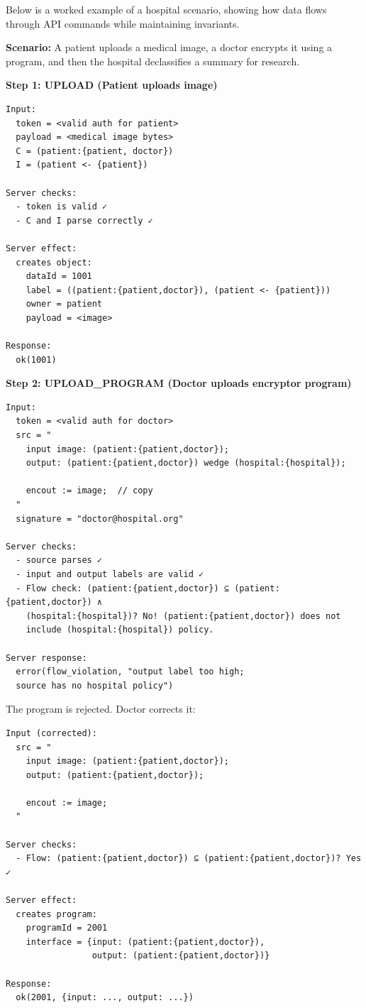 Below is a worked example of a hospital scenario, showing how data flows through API commands while maintaining invariants.

\textbf{Scenario:} A patient uploads a medical image, a doctor encrypts it using a program, and then the hospital declassifies a summary for research.

\textbf{Step 1: UPLOAD (Patient uploads image)}

\begin{verbatim}
Input:
  token = <valid auth for patient>
  payload = <medical image bytes>
  C = (patient:{patient, doctor})
  I = (patient <- {patient})

Server checks:
  - token is valid ✓
  - C and I parse correctly ✓
  
Server effect:
  creates object:
    dataId = 1001
    label = ((patient:{patient,doctor}), (patient <- {patient}))
    owner = patient
    payload = <image>
    
Response:
  ok(1001)
\end{verbatim}

\textbf{Step 2: UPLOAD\_PROGRAM (Doctor uploads encryptor program)}

\begin{verbatim}
Input:
  token = <valid auth for doctor>
  src = "
    input image: (patient:{patient,doctor});
    output: (patient:{patient,doctor}) wedge (hospital:{hospital});
    
    encout := image;  // copy
  "
  signature = "doctor@hospital.org"

Server checks:
  - source parses ✓
  - input and output labels are valid ✓
  - Flow check: (patient:{patient,doctor}) ⊆ (patient:{patient,doctor}) ∧ 
    (hospital:{hospital})? No! (patient:{patient,doctor}) does not 
    include (hospital:{hospital}) policy.
  
Server response:
  error(flow_violation, "output label too high; 
  source has no hospital policy")
\end{verbatim}

The program is rejected. Doctor corrects it:

\begin{verbatim}
Input (corrected):
  src = "
    input image: (patient:{patient,doctor});
    output: (patient:{patient,doctor});
    
    encout := image;
  "

Server checks:
  - Flow: (patient:{patient,doctor}) ⊆ (patient:{patient,doctor})? Yes ✓
  
Server effect:
  creates program:
    programId = 2001
    interface = {input: (patient:{patient,doctor}), 
                 output: (patient:{patient,doctor})}
    
Response:
  ok(2001, {input: ..., output: ...})
\end{verbatim}

